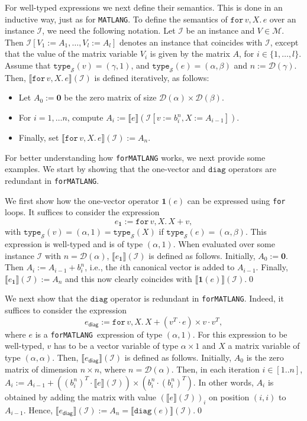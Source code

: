 \documentclass[sigconf]{acmart}
\newcommand{\sem}[2]{\llbracket #1 \rrbracket(#2)}
\newcommand{\Mnam}{\mathcal{M}}
\newcommand{\ones}{\mathbf{1}}
\newcommand{\diag}{\texttt{diag}}
\newcommand{\I}{\mathcal{I}}
\newcommand{\Sch}{\mathcal{S}}
\newcommand{\dom}{\mathcal{D}}
\newcommand{\ttype}{\texttt{type}_{\Sch}}
\newcommand{\lang}{\texttt{MATLANG}\xspace}
\newcommand{\langfor}{\texttt{for}\text{-}\texttt{MATLANG}\xspace}
\newcommand{\ffor}[3]{\texttt{for}\, #1,#2 \texttt{.}\, #3}
\begin{document}
For well-typed expressions we next define their semantics. This is done in an inductive way, just as for \lang. To define the semantics of $\ffor{v}{X}{e}$ over an instance $\I$, we need the following notation. Let $\I$ be an instance and $V\in \Mnam$. Then $\I[V_1 := A_1, \ldots, V_l:=A_l]$ denotes an instance that coincides with $\I$, except that the value of the matrix variable $V_i$ is given by the matrix $A$, for $i\in\lbrace 1, \ldots, l\rbrace$. Assume that
$\ttype(v)= (\gamma,1)$, and $\ttype(e) = (\alpha,\beta)$ and $n := \dom(\gamma)$. Then, $\sem{\ffor{v}{X}{e}}{\I}$ is defined iteratively, as follows:
\begin{itemize}
\item Let $A_0 := \mathbf{0}$ be the zero matrix of size $\dom(\alpha)\times \dom(\beta)$.
\item For $i=1,\ldots n$, compute $A_i:= \sem{e}{\I[v := b^{n}_i, X:= A_{i-1}]}$.
\item Finally, set $\sem{\ffor{v}{X}{e}}{\I}:= A_{n}$.
\end{itemize}

For better understanding how \langfor  works, we next provide some  examples.
We start by showing that the one-vector and $\diag$ operators are redundant
in \langfor.
\begin{example}\label{ex:onevec}
We first show how the one-vector operator $\ones(e)$ can be expressed using \texttt{for} loops.
It suffices to consider the expression
$$e_{\ones}:=\ffor{v}{X}{X+v},$$
with $\ttype(v)=(\alpha,1)=\ttype(X)$ if $\ttype(e)=(\alpha,\beta)$. This expression is well-typed
and is of type $(\alpha,1)$. When evaluated over some instance $\I$ with $n=\dom(\alpha)$, $\sem{e_{\ones}}{\I}$ is defined as follows.
Initially, $A_0:=\mathbf{0}$. Then $A_i:=A_{i-1}+b_i^n$, i.e., the $i$th canonical vector is added to $A_{i-1}$.
Finally, $\sem{e_{\ones}}{\I}:=A_n$ and this now clearly coincides with $\sem{\ones(e)}{\I}$.\qed
\end{example}

\begin{example}\label{ex:diag}
We next show that the $\diag$ operator is redundant in \langfor.
Indeed, it suffices to consider the expression
$$e_{\mathsf{diag}}:=
\ffor{v}{X}{X + (v^T\cdot e) \times v\cdot v^T},$$ where $e$ is a \langfor\  expression of type $(\alpha,1)$. For this expression to be well-typed, $v$ has to be a vector variable of type $\alpha\times 1$ and $X$ a matrix variable of type $(\alpha,\alpha)$. Then, $\sem{e_{\mathsf{diag}}}{\I}$ is defined as follows.
Initially, $A_0$ is the zero matrix of dimension $n\times n$, where $n=\dom(\alpha)$. Then, in each iteration
$i\in[1..n]$, $A_{i}:=A_{i-1}+  ((b_i^n)^T\cdot\sem{e}{\I})\times (b_i^n\cdot (b_i^n)^T)$. In other words, $A_i$ is obtained by adding the matrix with value $(\sem{e}{\I})_i$ on position $(i,i)$ to $A_{i-1}$. Hence, $\sem{e_{\mathsf{diag}}}{\I}:=A_n=\sem{\diag(e)}{\I}$.\qed
 \end{example}
\end{document}
